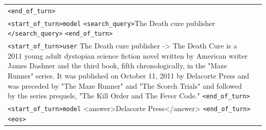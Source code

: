 \documentclass{article} %
\begin{document}
\begin{table}[h!]
\begin{tabular}{|p{5cm}|p{8cm}|}
        \texttt{\textless end\_of\_turn\textgreater} \\
        \texttt{\textless start\_of\_turn\textgreater model} \newline
        \texttt{\textless search\_query\textgreater}The Death cure publisher \texttt{\textless /search\_query\textgreater} \newline
        \texttt{\textless end\_of\_turn\textgreater} \\
        \texttt{\textless start\_of\_turn\textgreater user} \newline
        The Death cure publisher -> The Death Cure is a 2011 young adult dystopian science fiction novel written by American writer James Dashner and the third book, fifth chronologically, in the "Maze Runner" series. It was published on October 11, 2011 by Delacorte Press and was preceded by "The Maze Runner" and "The Scorch Trials" and followed by the series prequels, "The Kill Order and The Fever Code."
        \texttt{\textless end\_of\_turn\textgreater} \\
        \texttt{\textless start\_of\_turn\textgreater model} \newline
        <answer>Delacorte Press</answer>
        \texttt{\textless end\_of\_turn\textgreater}\texttt{\textless eos\textgreater} \\
    \end{tabular}
\end{table}
\end{document}
